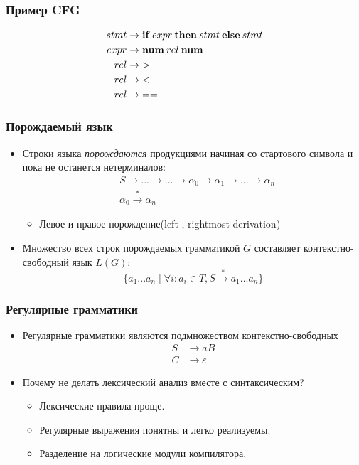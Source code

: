 \documentclass[16pt,pdf,unicode]{beamer}
\begin{document}
\begin{frame}
\frametitle{Пример CFG}
\begin{align*}
  stmt &\rightarrow \bold{if} \: expr \: \bold{then} \: stmt \: \bold{else} \: stmt\\
  expr &\rightarrow \bold{num} \: rel \: \bold{num}\\
  rel &\rightarrow \bold{>}\\
  rel &\rightarrow \bold{<}\\
  rel &\rightarrow \bold{==}
\end{align*}
\end{frame}

\begin{frame}
\frametitle{Порождаемый язык}
\begin{itemize}
  \item Строки языка \textit{порождаются} продукциями начиная со стартового символа и пока не останется нетерминалов:
  \begin{eqnarray*}
    &S \rightarrow ... \rightarrow ... \rightarrow \alpha_0 \rightarrow \alpha_1 \rightarrow ... \rightarrow \alpha_n \\
    &\alpha_0 \overset{*}{\rightarrow} \alpha_n
  \end{eqnarray*}
  \begin{itemize}
    \item Левое и правое порождение(left-, rightmost derivation)
  \end{itemize}
  \item Множество всех строк порождаемых грамматикой $G$ составляет контекстно-свободный язык $L(G)$:
  \begin{equation*}
    \{a_1...a_n\mid\forall i: a_i \in T, S\overset{*}{\rightarrow}a_1...a_n\}
  \end{equation*}
\end{itemize}
\end{frame}

\begin{frame}
\frametitle{Регулярные грамматики}
\begin{itemize}
  \item Регулярные грамматики являются подмножеством контекстно-свободных
    \begin{align*}
      S &\rightarrow a B \\
      C &\rightarrow \varepsilon
    \end{align*}
  \item Почему не делать лексический анализ вместе с синтаксическим?
    \begin{itemize}
      \item Лексические правила проще.
      \item Регулярные выражения понятны и легко реализуемы.
      \item Разделение на логические модули компилятора.
    \end{itemize}
\end{itemize}
\end{frame}
\end{document}
